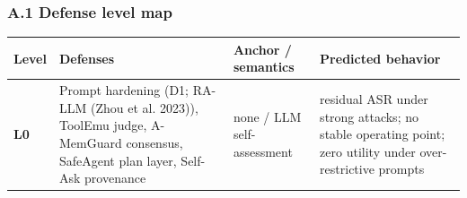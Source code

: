 \documentclass[

]{article}
\newcounter{none} %
\begin{document}
\subsubsection{A.1 Defense level map}\label{a.1-defense-level-map}



{\def\LTcaptype{none} %

\begin{longtable}[]{@{}

  >{\raggedright\arraybackslash}p{}

  >{\raggedright\arraybackslash}p{}

  >{\raggedright\arraybackslash}p{}

  >{\raggedright\arraybackslash}p{}@{}}

\toprule\noalign{}

\begin{minipage}[b]{\linewidth}\raggedright

Level

\end{minipage} & \begin{minipage}[b]{\linewidth}\raggedright

Defenses

\end{minipage} & \begin{minipage}[b]{\linewidth}\raggedright

Anchor / semantics

\end{minipage} & \begin{minipage}[b]{\linewidth}\raggedright

Predicted behavior

\end{minipage} \\

\midrule\noalign{}

\endhead

\bottomrule\noalign{}

\endlastfoot

\textbf{L0} & Prompt hardening (D1; RA-LLM ({Zhou et al.} 2023)), ToolEmu judge, A-MemGuard consensus, SafeAgent plan layer, Self-Ask provenance & none / LLM self-assessment & residual ASR under strong attacks; no stable operating point; zero utility under over-restrictive prompts \\


\end{longtable}}
\end{document}
